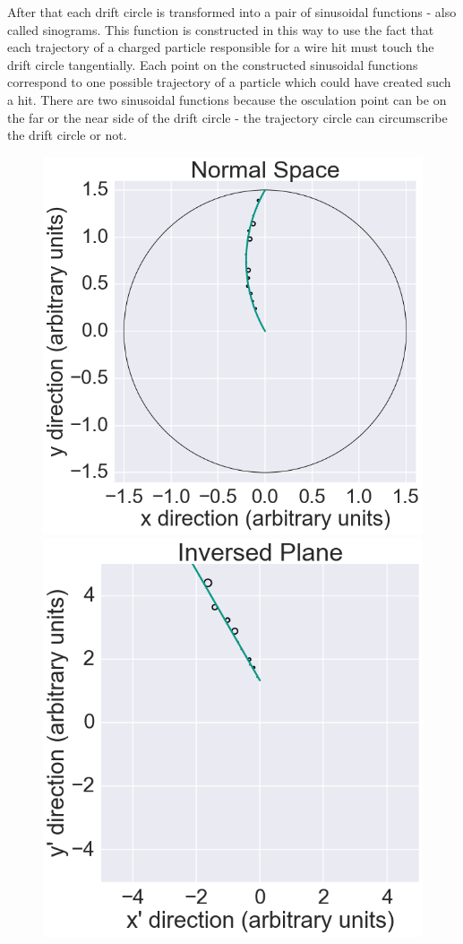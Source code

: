After that each drift circle is transformed into a pair of sinusoidal functions - also called sinograms. This function is constructed in this way to use the fact that each trajectory of a charged particle responsible for a wire hit must touch the drift circle tangentially. Each point on the constructed sinusoidal functions correspond to one possible trajectory of a particle which could have created such a hit. There are two sinusoidal functions because the osculation point can be on the far or the near side of the drift circle - the trajectory circle can circumscribe the drift circle or not.

\begin{figure}
 \centering
 \includegraphics[scale=0.2]{figures/theory/legendre_1.png}
 \includegraphics[scale=0.2]{figures/theory/legendre_2.png}

\end{figure}

